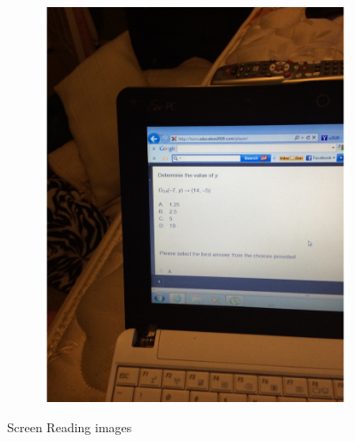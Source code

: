 \documentclass[sigconf]{acmart}
\begin{document}
\begin{figure}[hbp]
\begin{subfigure}[b]{0.45\columnwidth}
                \includegraphics[scale=0.3]{images/screen_2.pdf}  
        \end{subfigure}%
       
        \caption{Screen Reading images} 
        \label{fig:screen}
\end{figure}
\end{document}
